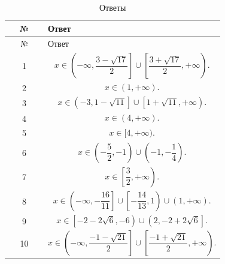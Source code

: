 \documentclass[a4paper,12pt]{article}
\begin{document}
\begin{longtable}{c>{\raggedright\arraybackslash}p{0.82\linewidth}}
\caption{Ответы}\\
\toprule
№ & Ответ \\
\midrule
\endfirsthead

\toprule
№ & Ответ \\
\midrule
\endhead

1 &
\[
x\in\left(-\infty,\frac{3-\sqrt{17}}2\right]\cup
\left[\frac{3+\sqrt{17}}2,+\infty\right).
\]
\\[0.6em]

2 &
\[
x\in(1,+\infty).
\]
\\[0.6em]

3 &
\[
x\in\left(-3,1-\sqrt{11}\right]\cup
\left[1+\sqrt{11},+\infty\right).
\]
\\[0.6em]

4 &
\[
x\in(4,+\infty).
\]
\\[0.6em]

5 &
\[
x\in[4,+\infty).
\]
\\[0.6em]

6 &
\[
x\in\left(-\frac52,-1\right)\cup
\left(-1,-\frac14\right).
\]
\\[0.6em]

7 &
\[
x\in\left[\frac32,+\infty\right).
\]
\\[0.6em]

8 &
\[
x\in\left(-\infty,-\frac{16}{11}\right]\cup
\left[-\frac{14}{13},1\right)\cup
(1,+\infty).
\]
\\[0.6em]

9 &
\[
x\in\left[-2-2\sqrt6,-6\right)\cup
\left(2,-2+2\sqrt6\right].
\]
\\[0.6em]

10 &
\[
x\in\left(-\infty,\frac{-1-\sqrt{21}}2\right]\cup
\left[\frac{-1+\sqrt{21}}2,+\infty\right).
\]
\\[0.6em]

\bottomrule
\end{longtable}
\end{document}
